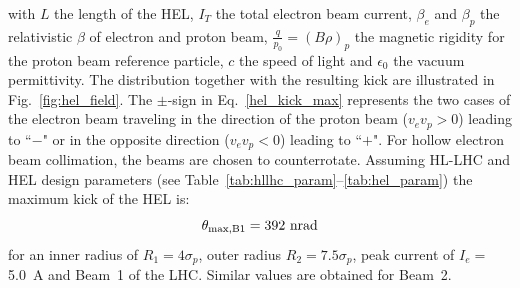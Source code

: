 \documentclass[%
 reprint,
 amsmath,amssymb,
 aps,
prstab,
]{revtex4-1}
\begin{document}
with $L$ the length of the HEL, $I_T$ the total electron beam current, $\beta_{e}$ and $\beta_{p}$ the relativistic $\beta$ of electron and proton beam, $\frac{q}{p_0}=\left(B\rho\right)_p$ the magnetic rigidity for the proton beam reference particle, $c$ the speed of light and $\epsilon_0$ the vacuum permittivity. The distribution together with the resulting kick are illustrated in Fig.~\ref{fig:hel_field}. The $\pm$-sign in Eq.~\ref{hel_kick_max} represents the two cases of the electron beam traveling in the direction of the proton beam ($v_e v_p>0$) leading to ``$-$" or in the opposite direction ($v_e v_p<0$) leading to ``$+$". For hollow electron beam collimation, the beams are chosen to counterrotate. Assuming HL-LHC and HEL design parameters (see Table~\ref{tab:hllhc_param}--\ref{tab:hel_param}) the maximum kick of the HEL is:
\begin{equation}\label{eqn:helkick}
\theta_{\rm max,B1} = 392~\rm{nrad}
\end{equation}
for an inner radius of $R_1=4\sigma_p$, outer radius $R_2=7.5\sigma_p$, peak current of $I_e=$\SI{5.0}{A} and Beam~1 of the LHC. Similar values are obtained for Beam~2.
\end{document}
